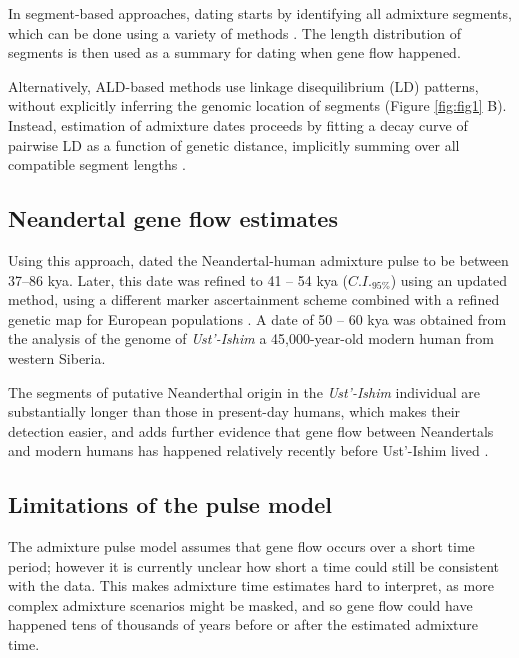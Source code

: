 \documentclass[11pt]{article}
\begin{document}
In segment-based approaches, dating starts by identifying all admixture segments, which can be done using a variety of methods \citep{seguin_orlando_paleogenomics_2014,sankararaman_combined_2016,vernot_excavating_2016,racimo_signatures_2017,skov_detecting_2018}. The length distribution of segments is then used as a summary for dating when gene flow happened.

Alternatively, ALD-based methods use linkage disequilibrium (LD) patterns, without explicitly inferring the genomic location of segments \citep{chimusa_dating_2018} (Figure \ref{fig:fig1} B). Instead, estimation of admixture dates proceeds by fitting a decay curve of pairwise LD as a function of genetic distance, implicitly summing over all compatible segment lengths \citep{moorjani_history_2011,loh_inferring_2013}. 


\subsection{Neandertal gene flow estimates}
Using this approach,   \cite{sankararaman_date_2012} dated the Neandertal-human admixture pulse to be  between 37--86 kya. Later, this date was refined to 41 -- 54 kya ($C.I._{95\%}$) using an updated method, using a different marker ascertainment scheme combined with a refined genetic map for European populations \citep{moorjani_genetic_2016}. A date of 50 -- 60 kya was obtained from the analysis of the genome of \textit{Ust'-Ishim} a 45,000-year-old modern human from western Siberia.

The segments of putative Neanderthal origin in the \textit{Ust'-Ishim} individual are substantially longer than those in present-day humans, which makes their detection easier, and adds further evidence that gene flow between Neandertals and modern humans has happened relatively recently before Ust'-Ishim lived \citep{fu_genome_2014}.


\subsection{Limitations of the pulse model}\label{Why can't we us the pulse model}

The admixture pulse model assumes that gene flow occurs over a short time period; however it is currently unclear how short a time could still be consistent with the data. This makes admixture time estimates hard to interpret, as more complex admixture scenarios might be masked, and so gene flow could have happened tens of thousands of years before or after the estimated admixture time.
\end{document}
